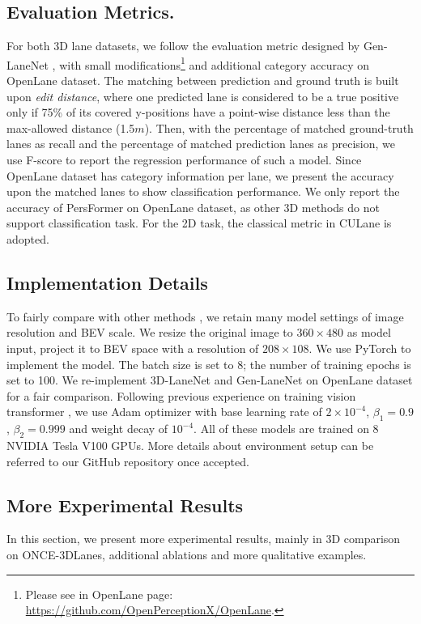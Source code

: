 \documentclass[runningheads]{llncs}
\begin{document}
\subsection{Evaluation Metrics.}
For both 3D lane datasets, we follow the evaluation metric designed by Gen-LaneNet \cite{guo2020gen}, with small modifications\footnote{Please see in OpenLane page: \url{https://github.com/OpenPerceptionX/OpenLane}.} and additional category accuracy on OpenLane dataset. 
The matching between prediction and ground truth is built upon \textit{edit distance}, where one predicted lane is considered to be a true positive only if 75\% of its covered y-positions have a point-wise distance less than the max-allowed distance (1.5$m$).
Then, with the percentage of matched ground-truth lanes as recall and the percentage of matched prediction lanes as precision, we use F-score to report the regression performance of such a model.
Since OpenLane dataset has category information per lane, we present the accuracy upon the matched lanes to show classification performance.
We only report the accuracy of PersFormer on OpenLane dataset, as other 3D methods do not support classification task.
For the 2D task, the classical metric in CULane \cite{pan2018spatial} is adopted.





\subsection{Implementation Details}
To fairly compare with other methods  \cite{guo2020gen,Garnett_2019_ICCV,liu2022learning}, we retain many model settings of image resolution and BEV scale.
We resize the original image to $360\times480$ as model input, project it to BEV space with a resolution of $208 \times 108$. 
We use PyTorch \cite{paszke2019pytorch} to implement the model.
The batch size is set to 8; the number of training epochs is set to 100.
We re-implement 3D-LaneNet and Gen-LaneNet on OpenLane dataset for a fair comparison.
Following previous experience on training vision transformer  \cite{carion2020end,zhu2021deformable,wang2022detr3d}, we use Adam optimizer \cite{2015KingmaBadam} with base learning rate of $2 \times 10^{-4}$, $\beta_1 = 0.9$, $\beta_2 = 0.999$ and weight decay of $10^{-4}$.
All of these models are trained on 8 NVIDIA Tesla V100 GPUs.
More details about environment setup can be referred to our GitHub repository once accepted.


\subsection{More Experimental Results}
In this section, we present more experimental results, mainly in 3D comparison on ONCE-3DLanes, additional ablations and more qualitative examples.
\end{document}
